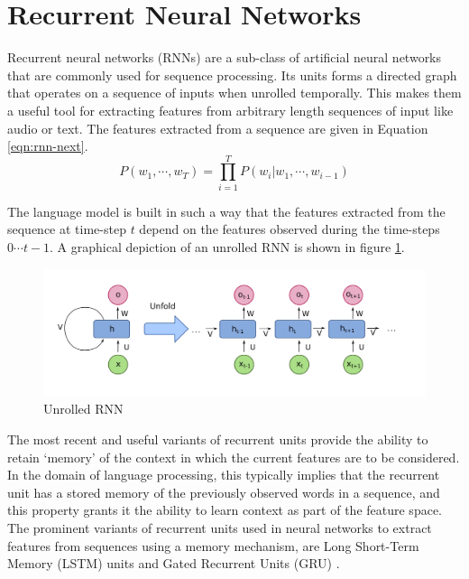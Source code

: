 \section{Recurrent Neural Networks}

Recurrent neural networks (RNNs) are a sub-class of artificial neural networks that are commonly used for sequence processing. Its units forms a directed graph that operates on a sequence of inputs when unrolled temporally. This makes them a useful tool for extracting features from arbitrary length sequences of input like audio or text. The features extracted from a sequence are given in Equation \ref{eqn:rnn-next}.
\begin{equation} \label{eqn:rnn-next}
	P(w_1, \cdots, w_T) = \prod_{i=1}^T P(w_i | w_1, \cdots, w_{i-1})
\end{equation}

The language model is built in such a way that the features extracted from the sequence at time-step $t$ depend on the features observed during the time-steps $0 \cdots t-1$. A graphical depiction of an unrolled RNN is shown in figure \ref{fig:recurrent-neural-network-unfold}.

\begin{figure}[ht]
	\centering
	\includegraphics[width=\textwidth]{images/recurrent-neural-network-unfold}
	\caption{\label{fig:recurrent-neural-network-unfold} Unrolled RNN}
\end{figure}

The most recent and useful variants of recurrent units provide the ability to retain `memory' of the context in which the current features are to be considered. In the domain of language processing, this typically implies that the recurrent unit has a stored memory of the previously observed words in a sequence, and this property grants it the ability to learn context as part of the feature space. The prominent variants of recurrent units used in neural networks to extract features from sequences using a memory mechanism, are Long Short-Term Memory (LSTM) units \citep{gers2001lstm} and Gated Recurrent Units (GRU) \citep{chung2014empirical}.

